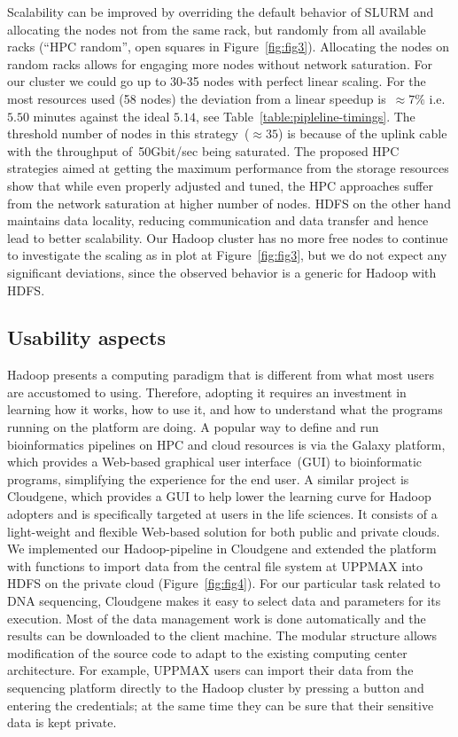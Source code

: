 \documentclass[10pt]{article}
\begin{document}
Scalability can be improved by overriding the default behavior of SLURM and allocating the nodes not from the same rack, but randomly from all available racks (``HPC random'', open squares in Figure~\ref{fig:fig3}). Allocating the nodes on random racks allows for engaging more nodes without network saturation. For our cluster we could go up to 30-35 nodes with perfect linear scaling. For the most resources used (58 nodes) the deviation from a linear speedup is~$\approx 7\%$ i.e. $5.50$ minutes against the ideal $5.14$, see Table~\ref{table:pipleline-timings}. The threshold number of nodes in this strategy~($\approx35$) is because of the uplink cable with the throughput of~50Gbit/sec being saturated. 
The proposed HPC strategies aimed at getting the maximum performance from the storage resources show that while even properly adjusted and tuned, the HPC approaches suffer from the network saturation at higher number of nodes.
HDFS on the other hand maintains data locality, reducing communication and data transfer and hence lead to better scalability.
Our Hadoop cluster has no more free nodes to continue to investigate the scaling as in plot at Figure~\ref{fig:fig3}, but we do not expect any significant deviations, since the observed behavior is a generic for Hadoop with HDFS\cite{lin2010, Hadoop:Guide}. 


\subsection*{Usability aspects}
\label{subsectionIV_2}

Hadoop presents a computing paradigm that is different from what most users are
accustomed to using.  Therefore, adopting it requires an investment in learning
how it works, how to use it, and how to understand what the programs running on
the platform are doing.
A popular way to define and run bioinformatics pipelines on HPC and cloud resources
is via the Galaxy\cite{galaxy,Afgan:2010uq} platform, which provides a Web-based graphical
user interface~(GUI) to bioinformatic programs, simplifying the experience for
the end user.
A similar project is Cloudgene\cite{cloudgene}, which provides a GUI to help lower the learning curve
for Hadoop adopters and is specifically targeted at users in the life
sciences. It consists of a light-weight and flexible Web-based solution for both
public and private clouds. We implemented our Hadoop-pipeline in Cloudgene and
extended the platform with functions to import data from the central file system
at UPPMAX into HDFS on the private cloud (Figure~\ref{fig:fig4}).  For our
particular task related to DNA sequencing, Cloudgene makes it easy to select
data and parameters for its execution. Most of the data management work is done
automatically and the results can be downloaded to the client machine. The
modular structure allows modification of the source code to adapt to the
existing computing center architecture. For example, UPPMAX users can import
their data from the sequencing platform directly to the Hadoop cluster by
pressing a button and entering the credentials; at the same time they can be
sure that their sensitive data is kept private.
\end{document}
